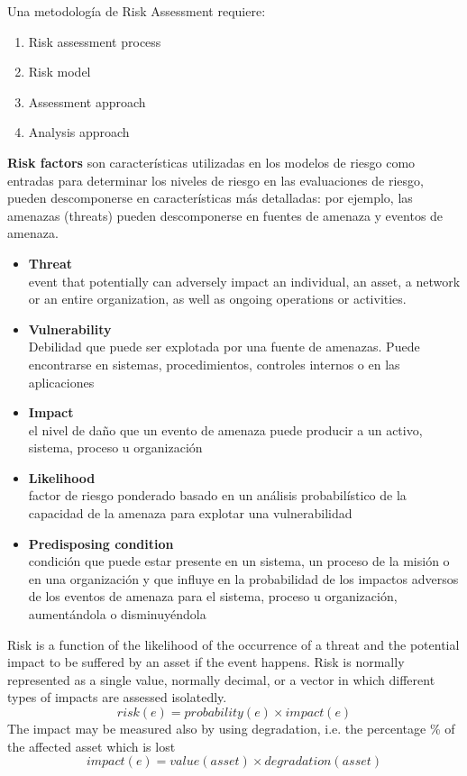 Una metodología de Risk Assessment requiere:
\begin{enumerate}
   \item Risk assessment process
   \item Risk model
   \item Assessment approach
   \item Analysis approach
\end{enumerate}

{\textbf{Risk factors} son características utilizadas en los modelos de riesgo como entradas para determinar los niveles de riesgo en las evaluaciones de riesgo, pueden descomponerse en características más detalladas: por ejemplo, las amenazas (threats) pueden descomponerse en fuentes de amenaza y eventos de amenaza.\ns
   \begin{itemize}
   	\item \textbf{Threat}\\
   	event that potentially can adversely impact an individual, an
asset, a network or an entire organization, as well as ongoing operations or
activities.
	   \item \textbf{Vulnerability}\\
	   Debilidad que puede ser explotada por una fuente de amenazas. Puede encontrarse en sistemas, procedimientos, controles internos o en las aplicaciones
	   \item \textbf{Impact}\\
	   el nivel de daño que un evento de amenaza puede producir a un activo, sistema, proceso u organización
	   \item \textbf{Likelihood}\\
      factor de riesgo ponderado basado en un análisis probabilístico de la capacidad de la amenaza para explotar una vulnerabilidad
	   \item \textbf{Predisposing condition}\\
	   condición que puede estar presente en un sistema, un proceso de la misión o en una organización y que influye en la probabilidad de los impactos adversos de los eventos de amenaza para el sistema, proceso u organización, aumentándola o disminuyéndola
   \end{itemize}
}

Risk is a function of the likelihood of the occurrence of a
threat and the potential impact to be suffered by an asset if
the event happens.
Risk is normally represented as a single value, normally
decimal, or a vector in which different types of impacts are
assessed isolatedly.
\[
risk(e) = probability(e) \times impact(e)
\]
The impact may be measured also by using degradation, i.e. the percentage \% of the affected asset which is lost 
\[
   impact(e) = value(asset) \times degradation(asset)
\]
